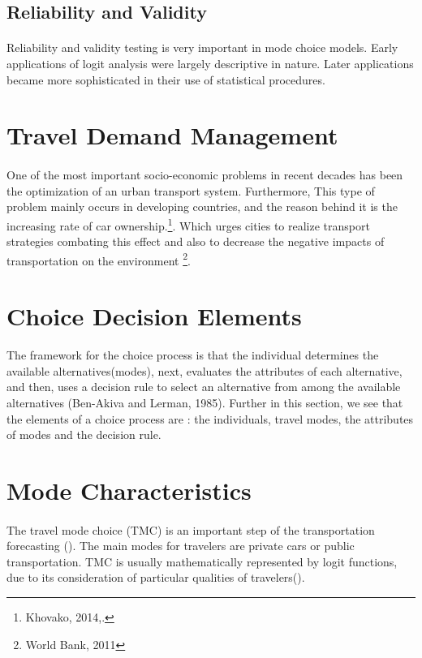 \subsection{Reliability and Validity}
\paragraph{}Reliability and validity testing is very important in mode choice models. Early applications of logit analysis were largely descriptive in nature. Later applications became more sophisticated in their use of statistical procedures.

\section{Travel Demand Management}
\paragraph{}One of the most important socio-economic problems in recent decades has been the optimization of an urban transport system. Furthermore, This type of problem mainly occurs in developing countries, and the reason behind it is the increasing rate of car ownership.\footnote{Khovako, 2014,.}. Which urges cities to realize transport strategies combating this effect and also to decrease the negative impacts of transportation on the environment \footnote{World Bank, 2011}.

\section{Choice Decision Elements}
The framework for the choice process is that the individual determines the available alternatives(modes), next, evaluates the attributes of each alternative, and then, uses a decision rule to select an alternative from among the available alternatives (Ben-Akiva and Lerman, 1985). Further in this section, we see that the elements of a choice process are : the individuals, travel modes, the attributes of modes and the decision rule.

\section{Mode Characteristics}
\paragraph{}The travel mode choice (TMC) is an important step of the transportation forecasting (\cite{Litman,2011}). The main modes for travelers are private cars or public transportation. TMC is usually mathematically represented by logit functions, due to its consideration of particular qualities of travelers(\cite{Bravo et al, 2009}).
